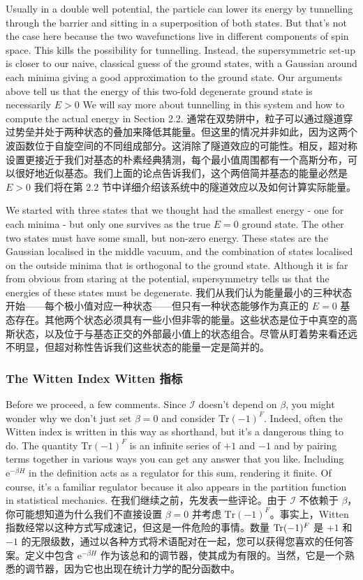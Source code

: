 \documentclass{article}
\newcommand{\rme}{\mathrm{e}}
\newcommand{\SakuraiYukiko}{\emoji{cherry-blossom}\emoji{snowflake}}
\begin{document}
Usually in a double well potential, the particle can lower its energy by tunnelling through the barrier and sitting in a superposition of both states. But that's not the case here because the two wavefunctions live in different components of spin space. This kills the possibility for tunnelling. Instead, the supersymmetric set-up is closer to our naive, classical guess of the ground states, with a Gaussian around each minima giving a good approximation to the ground state. Our arguments above tell us that the energy of this two-fold degenerate ground state is necessarily $E > 0$ We will say more about tunnelling in this system and how to compute the actual energy in Section 2.2.
通常在双势阱中，粒子可以通过隧道穿过势垒并处于两种状态的叠加来降低其能量。但这里的情况并非如此，因为这两个波函数位于自旋空间的不同组成部分。这消除了隧道效应的可能性。相反，超对称设置更接近于我们对基态的朴素经典猜测，每个最小值周围都有一个高斯分布，可以很好地近似基态。我们上面的论点告诉我们，这个两倍简并基态的能量必然是 $E > 0$ 我们将在第 2.2 节中详细介绍该系统中的隧道效应以及如何计算实际能量。

We started with three states that we thought had the smallest energy - one for each minima - but only one survives as the true $E = 0$ ground state. The other two states must have some small, but non-zero energy. These states are the Gaussian localised in the middle vacuum, and the combination of states localised on the outside minima that is orthogonal to the ground state. Although it is far from obvious from staring at the potential, supersymmetry tells us that the energies of these states must be degenerate.
我们从我们认为能量最小的三种状态开始——每个极小值对应一种状态——但只有一种状态能够作为真正的 $E = 0$ 基态存在。其他两个状态必须具有一些小但非零的能量。这些状态是位于中真空的高斯状态，以及位于与基态正交的外部最小值上的状态组合。尽管从盯着势来看还远不明显，但超对称性告诉我们这些状态的能量一定是简并的。

\subsubsection{The Witten Index \SakuraiYukiko Witten 指标}

Before we proceed, a few comments. Since $\mathcal{I}$ doesn't depend on $\beta$, you might wonder why we don't just set $\beta = 0$ and consider $\mathrm{Tr} (-1)^F$. Indeed, often the Witten index is written in this way as shorthand, but it's a dangerous thing to do. The quantity $\mathrm{Tr} (-1)^F$ is an infinite series of $+ 1$ and $- 1$ and by pairing terms together in various ways you can get any answer that you like. Including $\rme^{- \beta H}$ in the definition acts as a regulator for this sum, rendering it finite. Of course, it's a familiar regulator because it also appears in the partition function in statistical mechanics.
在我们继续之前，先发表一些评论。由于 $\mathcal{I}$ 不依赖于 $\beta$，你可能想知道为什么我们不直接设置 $\beta = 0$ 并考虑 $\mathrm{Tr} (-1)^F$。事实上，Witten 指数经常以这种方式写成速记，但这是一件危险的事情。数量 $\operatorname{Tr} (-1)^F$ 是 $+ 1$ 和 $- 1$ 的无限级数，通过以各种方式将术语配对在一起，您可以获得您喜欢的任何答案。定义中包含 $\rme^{- \beta H}$ 作为该总和的调节器，使其成为有限的。当然，它是一个熟悉的调节器，因为它也出现在统计力学的配分函数中。
\end{document}
